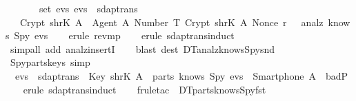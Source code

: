 \begin{isabellebody}
  \ \ \ \ \ {\isasymrbrace}\ {\isasymin}\ set\ evs{\isacharsemicolon}\ evs\ {\isasymin}\ sdaptrans\ {\isasymrbrakk}\isanewline
  \ \ {\isasymLongrightarrow}\ Crypt\ {\isacharparenleft}shrK\ A{\isacharparenright}\ {\isasymlbrace}\ {\isasymlbrace}Agent\ A{\isacharcomma}\ Number\ T{\isasymrbrace}{\isacharcomma}\ Crypt\ {\isacharparenleft}shrK\ A{\isacharparenright}\ {\isacharparenleft}Nonce\ r{\isacharparenright}\ {\isasymrbrace}\ {\isasymin}\ analz\ {\isacharparenleft}knows\ Spy\ evs{\isacharparenright}{\isachardoublequoteclose}\isanewline
  \isadelimproof
  \isanewline
  \ \ %
  \endisadelimproof
  \isatagproof
  \isamarkupfalse%
  \ {\isacharparenleft}erule\ rev{\isacharunderscore}mp{\isacharparenright}\isanewline
  \ \ \isamarkupfalse%
  \ {\isacharparenleft}erule\ sdaptrans{\isachardot}induct{\isacharparenright}\isanewline
  \ \ \isamarkupfalse%
  \ {\isacharparenleft}simp{\isacharunderscore}all\ add{\isacharcolon}\ analz{\isacharunderscore}insertI{\isacharparenright}\isanewline
  \ \ \isamarkupfalse%
  \ {\isacharparenleft}blast\ dest{\isacharbang}{\isacharcolon}\ DT{}{\isacharunderscore}analz{\isacharunderscore}knows{\isacharunderscore}Spy{\isacharunderscore}snd{\isacharparenright}{\isacharplus}\isanewline
  \isamarkupfalse%
  \endisatagproof
  {\isafoldproof}%
  \isadelimproof
  \endisadelimproof
  \isadelimdocument
  \endisadelimdocument
  \isatagdocument
  \isamarkuptrue%
  \endisatagdocument
  {\isafolddocument}%
  \isadelimdocument
  \endisadelimdocument
  \isamarkupfalse%
  \ Spy{\isacharunderscore}parts{\isacharunderscore}keys\ {\isacharbrackleft}simp{\isacharbrackright}\ {\isacharcolon}\ \isanewline
  \ \ {\isachardoublequoteopen}evs\ {\isasymin}\ sdaptrans\ {\isasymLongrightarrow}\ {\isacharparenleft}Key\ {\isacharparenleft}shrK\ A{\isacharparenright}\ {\isasymin}\ parts\ {\isacharparenleft}knows\ Spy\ evs{\isacharparenright}{\isacharparenright}\ {\isacharequal}\ {\isacharparenleft}Smartphone\ A\ {\isasymin}\ badP{\isacharparenright}{\isachardoublequoteclose}\isanewline
  \isadelimproof
  \isanewline
  \ \ %
  \endisadelimproof
  \isatagproof
  \isamarkupfalse%
  \ {\isacharparenleft}erule\ sdaptrans{\isachardot}induct{\isacharparenright}\isanewline
  \ \ \isamarkupfalse%
  \ {\isacharparenleft}frule{\isacharunderscore}tac\ {\isacharbrackleft}{}{\isacharbrackright}\ DT{}{\isacharunderscore}parts{\isacharunderscore}knows{\isacharunderscore}Spy{\isacharunderscore}fst{\isacharparenright}\isanewline

\end{isabellebody}
